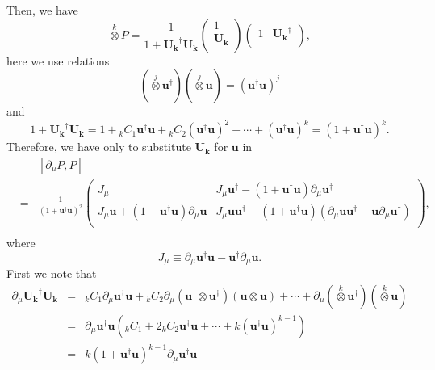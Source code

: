 \documentclass[makeidx,12pt,openany]{report}
\begin{document}
Then, we have 
\begin{equation}
\stackrel{k}{\otimes} \! P=
\frac{1}{1+\mathbf{U_k}^{\dag}\mathbf{U_k}}
 \left(
 \begin{array}{c}
     1       \\
  \mathbf{U_k} \\
 \end{array}
 \right)
 \left(
 \begin{array}{cc}
     1  & \mathbf{U_k}^{\dag} \\
 \end{array}
 \right) , 
\end{equation}
here we use relations
\begin{equation}
(\stackrel{j}{\otimes} \!\mathbf{u}^{\dag})
(\stackrel{j}{\otimes} \! \mathbf{u})
=(\mathbf{u}^{\dag}\mathbf{u})^j
\end{equation}
and
\begin{equation}
1+\mathbf{U_k}^{\dag}\mathbf{U_k}=1+{}_k C_1 \mathbf{u}^{\dag}\mathbf{u}+
 {}_k C_2 (\mathbf{u}^{\dag}\mathbf{u})^2+\cdots+
 (\mathbf{u}^{\dag}\mathbf{u})^k=(1+\mathbf{u}^{\dag}\mathbf{u})^k. 
\end{equation}
Therefore, we have only to substitute $\mathbf{U_k}$ for $\mathbf{u}$ in 
\begin{eqnarray}
&& [\partial_{\mu}P,P] \nonumber\\
&=&\frac{1}{(1+\mathbf{u}^{\dag}\mathbf{u})^2}
 \left(
 \begin{array}{cc}
  J_{\mu}
  & J_{\mu}\mathbf{u}^{\dag}
   -(1+\mathbf{u}^{\dag}\mathbf{u})\partial_{\mu}\mathbf{u}^{\dag} \\
  J_{\mu}\mathbf{u}
   +(1+\mathbf{u}^{\dag}\mathbf{u})\partial_{\mu}\mathbf{u} 
  & J_{\mu}\mathbf{u}\mathbf{u}^{\dag}
   +(1+\mathbf{u}^{\dag}\mathbf{u})
   (\partial_{\mu}\mathbf{u}\mathbf{u}^{\dag}
    -\mathbf{u}\partial_{\mu}\mathbf{u}^{\dag}) \\
 \end{array}
 \right) , \nonumber\\
&& \label{eqn:NoetCurr}
\end{eqnarray}
where
\begin{equation*}
 J_{\mu} \equiv \partial_{\mu}\mathbf{u}^{\dag}\mathbf{u}
             -\mathbf{u}^{\dag}\partial_{\mu}\mathbf{u}. 
\end{equation*}
First we note that 
\begin{eqnarray*}
 \partial_{\mu}\mathbf{U_k}^{\dag}\mathbf{U_k}
 &=& {}_k C_1 \partial_{\mu}\mathbf{u}^{\dag}\mathbf{u}
     +{}_k C_2 \partial_{\mu}(\mathbf{u}^{\dag} \otimes \mathbf{u}^{\dag})
      (\mathbf{u} \otimes \mathbf{u})
      +\cdots+
      \partial_{\mu}(\stackrel{k}{\otimes} \! \mathbf{u}^{\dag})
      (\stackrel{k}{\otimes} \! \mathbf{u}) \\
 &=& \partial_{\mu}\mathbf{u}^{\dag}\mathbf{u}
      ({}_k C_1 + 2{}_k C_2 \mathbf{u}^{\dag}\mathbf{u}
      +\cdots+k(\mathbf{u}^{\dag}\mathbf{u})^{k-1}) \\
 &=& k(1+\mathbf{u}^{\dag}\mathbf{u})^{k-1}
      \partial_{\mu}\mathbf{u}^{\dag}\mathbf{u}
\end{eqnarray*}
\end{document}
